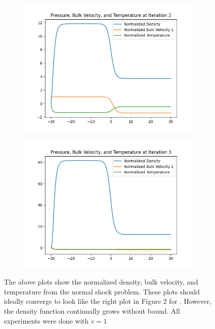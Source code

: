 \documentclass{article}
\begin{document}
\begin{figure}[h]
    \begin{subfigure}[b]{0.45\textwidth}
    \includegraphics[width=\textwidth]{imgs/iter2.png}
        \label{fig:image3}
    \end{subfigure}
    \hfill
    \begin{subfigure}[b]{0.45\textwidth}
    \includegraphics[width=\textwidth]{imgs/iter3.png}
        \label{fig:image4}
    \end{subfigure}
    
    \caption{The above plots show the normalized density, bulk velocity, and temperature from the normal shock problem. These plots should ideally converge to look like the right plot in Figure 2 for \cite{hu2021adaptive}. However, the density function continually grows without bound. All experiments were done with $v=1$}
    \label{fig:four_images}
\end{figure}
\end{document}
